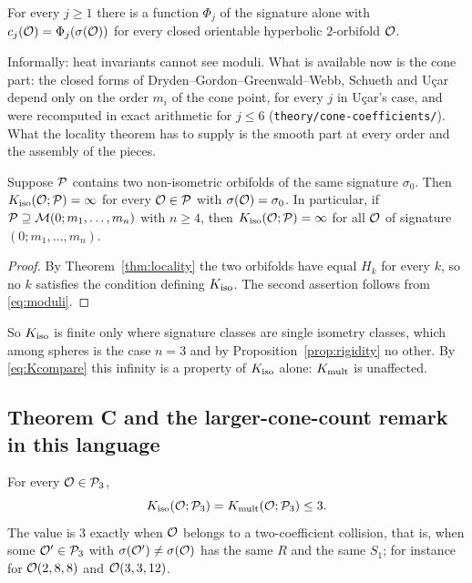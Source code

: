 \begin{theorem}\label{thm:locality}
For every $j\ge1$ there is a function $\Phi_j$ of the signature alone with
$c_j(\mathcal{O})=\Phi_j(\sigma(\mathcal{O}))$ for every closed orientable hyperbolic $2$-orbifold $\mathcal{O}$.
\end{theorem}

\noindent
Informally: heat invariants cannot see moduli. What is available now is the cone part: the
closed forms of Dryden--Gordon--Greenwald--Webb, Schueth and U\c{c}ar
\cite{dggw2008, schueth2019, ucar2017} depend only on the order $m_i$ of the cone point, for every
$j$ in U\c{c}ar's case, and were recomputed in exact arithmetic for $j\le6$
(\texttt{theory/cone-coefficients/}). What the locality theorem has to supply is the smooth part
at every order and the assembly of the pieces.

\begin{proposition}\label{prop:Kinf}
Suppose $\mathcal{P}$ contains two non-isometric orbifolds of the same signature $\sigma_0$. Then
$K_{\mathrm{iso}}(\mathcal{O};\mathcal{P})=\infty$ for every $\mathcal{O}\in\mathcal{P}$ with $\sigma(\mathcal{O})=\sigma_0$. In particular,
if $\mathcal{P}\supseteq\mathcal M(0;m_1,\dots,m_n)$ with $n\ge4$, then $K_{\mathrm{iso}}(\mathcal{O};\mathcal{P})=\infty$ for all
$\mathcal{O}$ of signature $(0;m_1,\dots,m_n)$.
\end{proposition}

\begin{proof}
By Theorem~\ref{thm:locality} the two orbifolds have equal $H_k$ for every $k$, so no $k$ satisfies the
condition defining $K_{\mathrm{iso}}$. The second assertion follows from \eqref{eq:moduli}.
\end{proof}

\noindent
So $K_{\mathrm{iso}}$ is finite only where signature classes are single isometry classes, which among spheres
is the case $n=3$ and by Proposition~\ref{prop:rigidity} no other.
By \eqref{eq:Kcompare} this infinity is a property of $K_{\mathrm{iso}}$ alone: $K_{\mathrm{mult}}$ is unaffected.

\subsection{Theorem C and the larger-cone-count remark in this language}

\begin{theorem}\label{thm:Crestated}
For every $\mathcal{O}\in\mathcal{P}_3$,
\[
  K_{\mathrm{iso}}(\mathcal{O};\mathcal{P}_3)=K_{\mathrm{mult}}(\mathcal{O};\mathcal{P}_3)\le3 .
\]
The value is $3$ exactly when $\mathcal{O}$ belongs to a two-coefficient collision, that is, when some
$\mathcal{O}'\in\mathcal{P}_3$ with $\sigma(\mathcal{O}')\ne\sigma(\mathcal{O})$ has the same $R$ and the same $S_1$; for
instance for $\mathcal{O}(2,8,8)$ and $\mathcal{O}(3,3,12)$.
\end{theorem}

